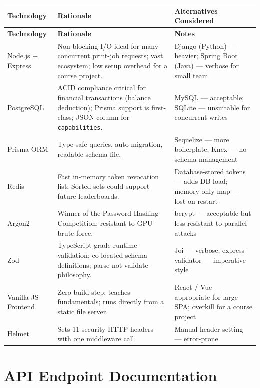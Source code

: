 \documentclass[12pt,a4paper]{report}
\begin{document}
\begin{longtable}{L{3cm} L{5.5cm} L{5.5cm}}
  \toprule
  \textbf{Technology} & \textbf{Rationale} & \textbf{Alternatives Considered} \\
  \midrule
  \endfirsthead
  \midrule
  \textbf{Technology} & \textbf{Rationale} & \textbf{Notes} \\
  \midrule
  \endhead
  \bottomrule
  \endfoot
  Node.js + Express & Non-blocking I/O ideal for many concurrent print-job requests; vast
    ecosystem; low setup overhead for a course project. & Django (Python) — heavier; Spring Boot (Java) — verbose for small team \\
  PostgreSQL & ACID compliance critical for financial transactions (balance deduction);
    Prisma support is first-class; JSON column for \texttt{capabilities}. & MySQL — acceptable; SQLite — unsuitable for concurrent writes \\
  Prisma ORM & Type-safe queries, auto-migration, readable schema file. & Sequelize — more boilerplate; Knex — no schema management \\
  Redis & Fast in-memory token revocation list; Sorted sets could support future leaderboards.
    & Database-stored tokens — adds DB load; memory-only map — lost on restart \\
  Argon2 & Winner of the Password Hashing Competition; resistant to GPU brute-force. & bcrypt — acceptable but less resistant to parallel attacks \\
  Zod & TypeScript-grade runtime validation; co-located schema definitions; parse-not-validate
    philosophy. & Joi — verbose; express-validator — imperative style \\
  Vanilla JS Frontend & Zero build-step; teaches fundamentals; runs directly from a static file
    server. & React / Vue — appropriate for large SPA; overkill for a course project \\
  Helmet & Sets 11 security HTTP headers with one middleware call. & Manual header-setting — error-prone \\
\end{longtable}

\section{API Endpoint Documentation}
\end{document}
